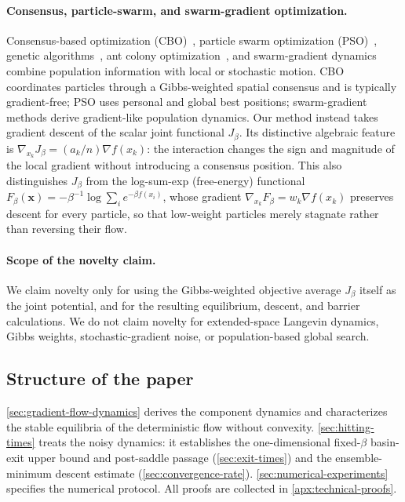 \documentclass{article}
\theoremstyle{plain}
\theoremstyle{definition}
\theoremstyle{remark}
\newcommand{\xx}{\mathbf{x}}
\begin{document}
\paragraph{Consensus, particle-swarm, and swarm-gradient optimization.}
Consensus-based optimization (CBO)~\cite{CarrilloChoiTotzeckTse2018,pinnau2017consensus,carrillo2021consensus,fornasier2024consensus}, particle swarm optimization (PSO)~\cite{kennedy1995particle,noel2012new}, genetic algorithms~\cite{Goldberg1989}, ant colony optimization~\cite{DorigoStutzle2004}, and swarm-gradient dynamics~\cite{bolte2024swarm,riedl2023gradient,tang2024discrete} combine population information with local or stochastic motion. CBO coordinates particles through a Gibbs-weighted spatial consensus and is typically gradient-free; PSO uses personal and global best positions; swarm-gradient methods derive gradient-like population dynamics. Our method instead takes gradient descent of the scalar joint functional \(J_\beta\). Its distinctive algebraic feature is \(\nabla_{x_k}J_\beta=(a_k/n)\nabla f(x_k)\): the interaction changes the sign and magnitude of the local gradient without introducing a consensus position. This also distinguishes \(J_\beta\) from the log-sum-exp (free-energy) functional \(F_\beta(\xx)=-\beta^{-1}\log\sum_i e^{-\beta f(x_i)}\), whose gradient \(\nabla_{x_k}F_\beta=w_k\nabla f(x_k)\) preserves descent for every particle, so that low-weight particles merely stagnate rather than reversing their flow.

\paragraph{Scope of the novelty claim.}
We claim novelty only for using the Gibbs-weighted objective average \(J_\beta\) itself as the joint potential, and for the resulting equilibrium, descent, and barrier calculations. We do not claim novelty for extended-space Langevin dynamics, Gibbs weights, stochastic-gradient noise, or population-based global search.

\subsection{Structure of the paper}
\label{sec:structure}

\ref{sec:gradient-flow-dynamics} derives the component dynamics and characterizes the stable equilibria of the deterministic flow without convexity. \ref{sec:hitting-times} treats the noisy dynamics: it establishes the one-dimensional fixed-\(\beta\) basin-exit upper bound and post-saddle passage (\ref{sec:exit-times}) and the ensemble-minimum descent estimate (\ref{sec:convergence-rate}). \ref{sec:numerical-experiments} specifies the numerical protocol. All proofs are collected in \ref{apx:technical-proofs}.
\end{document}
